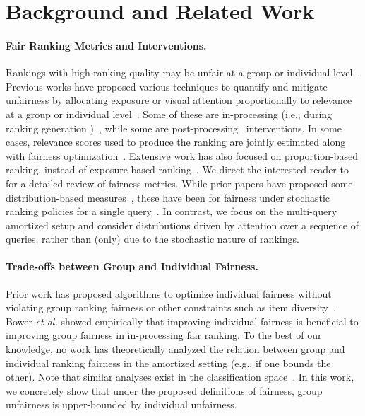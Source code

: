 \section{Background and Related Work}
\vspace{-0.9em}
\paragraph{Fair Ranking Metrics and Interventions.} Rankings with high ranking quality may be unfair at a group or individual level~\cite{biega2018equity, diaz2020evaluating, singh2018fairness, morik2020controlling, bower2020individually,zehlike2021fairness,mehrotra2022fair}. Previous works have proposed various techniques to quantify and mitigate unfairness by allocating exposure or visual attention proportionally to relevance at a group or individual level~\cite{yang2023vertical,biega2018equity, diaz2020evaluating, singh2018fairness, morik2020controlling, bower2020individually,zehlike2021fairness,heuss2022fairness}. Some of these are in-processing (i.e., during ranking generation )~\cite{singh2019policy,bower2020individually,xu2024fairsync}, while some are post-processing~\cite{biega2018equity,sarvi2022understanding} interventions.  In some cases, relevance scores used to produce the ranking are jointly estimated along with fairness optimization~\cite{morik2020controlling,singh2019policy,bower2020individually}. Extensive work has also focused on proportion-based ranking, instead of exposure-based ranking~\cite{gorantla2023sampling,gorantla2021problem,geyik2019fairness}. We direct the interested reader to ~\cite{raj2022measuring} for a detailed review of fairness metrics. While prior papers have proposed some distribution-based measures~\cite{garcia2021maxmin,diaz2020evaluating}, these have been for fairness under stochastic ranking policies for a single query~\cite{gorantla2023sampling,singh2018fairness}. In contrast, we focus on the multi-query amortized setup and consider distributions driven by attention over a sequence of queries, rather than (only) due to the stochastic nature of rankings. 


\paragraph{Trade-offs between Group and Individual Fairness.}
Prior work has proposed algorithms to optimize individual fairness without violating group ranking fairness or other constraints such as item diversity~\cite{garcia2021maxmin,saito2022fair,gorantla2021problem,gorantla2023sampling,flanigan2021fair}. Bower \emph{et al.} \citep{bower2020individually} showed empirically that improving individual fairness is beneficial to improving group fairness in in-processing fair ranking. To the best of our knowledge, no work has theoretically analyzed the relation between group and individual ranking fairness in the amortized setting (e.g., if one bounds the other). Note that similar analyses exist in the classification space~\cite{dwork2012fairness}. In this work, we concretely show that under the proposed definitions of fairness, group unfairness is upper-bounded by individual unfairness.



